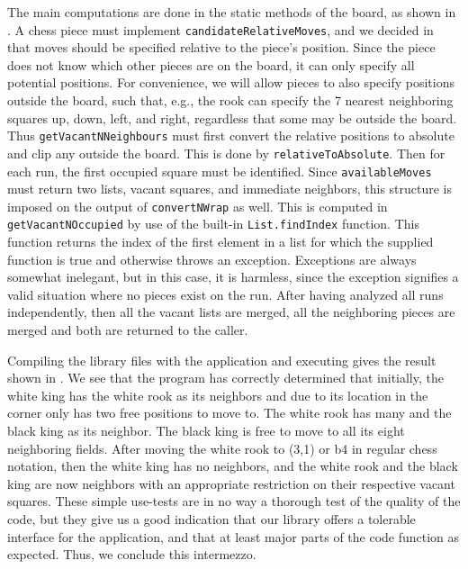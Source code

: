 \documentclass[fsharpNotes.tex]{subfiles}
\begin{document}
The main computations are done in the static methods of the board, as shown in . 
%
%
A chess piece must implement \lstinline{candidateRelativeMoves}, and we decided in  that moves should be specified relative to the piece's position. Since the piece does not know which other pieces are on the board, it can only specify all potential positions. For convenience, we will allow pieces to also specify positions outside the board, such that, e.g., the rook can specify the 7 nearest neighboring squares up, down, left, and right, regardless that some may be outside the board. Thus \lstinline{getVacantNNeighbours} must first convert the relative positions to absolute and clip any outside the board. This is done by \lstinline{relativeToAbsolute}. Then for each run, the first occupied square must be identified. Since \lstinline{availableMoves} must return two lists, vacant squares, and immediate neighbors, this structure is imposed on the output of \lstinline{convertNWrap} as well. This is computed in \lstinline{getVacantNOccupied} by use of the built-in \lstinline{List.findIndex} function. This function returns the index of the first element in a list for which the supplied function is true and otherwise throws an exception. Exceptions are always somewhat inelegant, but in this case, it is harmless, since the exception signifies a valid situation where no pieces exist on the run. After having analyzed all runs independently, then all the vacant lists are merged, all the neighboring pieces are merged and both are returned to the caller.

Compiling the library files with the application and executing gives the result shown in .
%
%
We see that the program has correctly determined that initially, the white king has the white rook as its neighbors and due to its location in the corner only has two free positions to move to. The white rook has many and the black king as its neighbor. The black king is free to move to all its eight neighboring fields. After moving the white rook to (3,1) or b4 in regular chess notation, then the white king has no neighbors, and the white rook and the black king are now neighbors with an appropriate restriction on their respective vacant squares. These simple use-tests are in no way a thorough test of the quality of the code, but they give us a good indication that our library offers a tolerable interface for the application, and that at least major parts of the code function as expected. Thus, we conclude this intermezzo.
\end{document}
